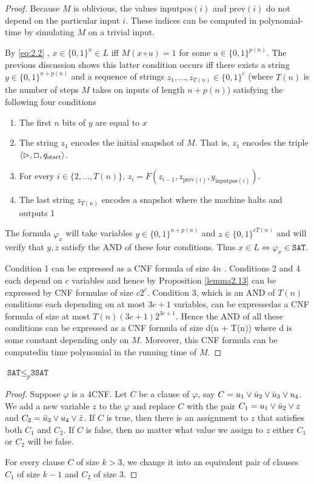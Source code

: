 \documentclass[11pt]{article}
\def \start {\text{start}}
\def \SAT {\texttt{SAT}}
\def \TSAT {\texttt{3SAT}}
\begin{document}
\begin{proof}
Because \(M\) is oblivious, the values \(\text{inputpos}(i)\) and \(\text{prev}(i)\) do not
depend on the particular input \(i\). These indices can be computed in polynomial-time by
simulating \(M\) on a trivial input.

By \eqref{eq:2.2} , \(x\in\{0,1\}^{n}\in L\) iff \(M(x\circ u)=1\) for
some \(u\in\{0,1\}^{p(n)}\). The previous discussion shows this latter condition occurs iff
there exists a string \(y\in\{0,1\}^{n+p(n)}\) and a sequence of strings
\(z_1,\dots,z_{T(n)}\in\{0,1\}^c\) (where \(T(n)\) is the number of steps \(M\) takes on inputs
of length \(n+p(n)\)) satisfying the following four conditions
\begin{enumerate}
\item The first \(n\) bits of \(y\) are equal to \(x\)
\item The string \(z_1\) encodes the initial snapshot of \(M\). That is, \(z_1\) encodes the
triple \(\la\rhd,\Box,q_{\start}\ra\).
\item For every \(i\in\{2,\dots,T(n)\}\), \(z_i=F(z_{i-1},z_{\text{prev}(i)},y_{\text{inputpos}(i)})\).
\item The last string \(z_{T(n)}\) encodes a snapshot where the machine halts and outputs 1
\end{enumerate}


The formula \(\varphi_x\) will take variables \(y\in\{0,1\}^{n+p(n)}\)
and \(z\in\{0,1\}^{cT(n)}\) and will verify that \(y,z\) satisfy the AND of these four
conditions. Thus \(x\in L\Leftrightarrow\varphi_x\in\SAT\).

Condition 1 can be expressed as a CNF formula of size \(4n\) . Conditions 2 and 4 each depend
on \(c\) variables and hence by Proposition \ref{lemma2.13} can be expressed by CNF formulae of
size \(c2^c\). Condition 3, which is an AND of \(T(n)\) conditions each  depending on at most \(3c+1\)
variables, can be expressedas a CNF formula of size at most \(T(n)(3c+1)2^{3c+1}\). Hence the AND of all
these conditions can be expressed as a CNF formula of size d(n + T(n)) where d is some constant
depending only on \(M\). Moreover, this CNF formula can be computedin time polynomial in the running
time of \(M\).
\end{proof}

\begin{lemma}[]
\(\SAT\le_p\TSAT\)
\end{lemma}

\begin{proof}
Suppose \(\varphi\) is a 4CNF. Let \(C\) be a clause of \(\varphi\), say \(C=u_1\vee\bar{u}_2\vee\bar{u}_3\vee u_4\).
We add a new variable \(z\) to the \(\varphi\) and replace \(C\) with the pair
\(C_1=u_1\vee\bar{u}_2\vee z\) and \(C_2=\bar{u}_3\vee u_4\vee\bar{z}\). If \(C\) is true, then there
is an assignment to \(z\) that satisfies both \(C_1\) and \(C_2\). If \(C\) is false, then no
matter what value we assign to \(z\) either \(C_1\) or \(C_2\) will be false.

For every clause \(C\) of size \(k>3\), we change it into an equivalent pair of clauses \(C_1\)
of size \(k-1\) and \(C_2\) of size 3.
\end{proof}
\end{document}
